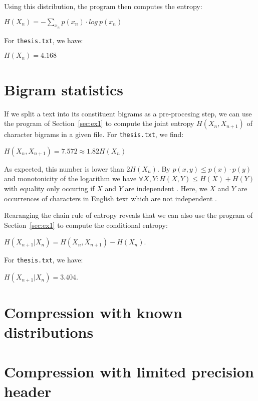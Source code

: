 \documentclass[10pt,a4paper,twoside,onecolumn]{article}
\newcommand*{\thesisTXT}{{\tt thesis.txt}\xspace}
\begin{document}
Using this distribution, the program then computes the entropy:

\begin{center}
    $H(X_n) = -\sum\limits_{x_n} p(x_n) \cdot log~p(x_n)$
\end{center}

For \thesisTXT, we have:

\begin{center}
    $H(X_n) = 4.168$
\end{center}

\section{Bigram statistics}\label{sec:ex2}

If we split a text into its constituent bigrams as a pre-procesing step, we can
use the program of Section~\ref{sec:ex1} to compute the joint entropy $H(X_n,
X_{n+1})$ of character bigrams in a given file. For \thesisTXT, we find:

\begin{center}
    $H(X_n, X_{n+1}) = 7.572 \approx 1.82H(X_n)$
\end{center}

As expected, this number is lower than $2H(X_n)$. By $p(x,y) \le p(x) \cdot
p(y)$ and monotonicity of the logarithm we have $\forall X,Y: H(X, Y) \le H(X) +
H(Y)$ with equality only occuring if $X$ and $Y$ are independent
\cite[p.~138]{mackay}. Here, we $X$ and $Y$ are occurrences of characters in
English text which are not independent \cite[p.~22-24]{mackay}.

Rearanging the chain rule of entropy \cite[p.~139]{mackay} reveals that we can
also use the program of Section~\ref{sec:ex1} to compute the conditional
entropy:

\begin{center}
    $H(X_{n+1} | X_n) = H(X_n, X_{n+1}) - H(X_n)$.
\end{center}

For \thesisTXT, we have:

\begin{center}
    $H(X_{n+1} | X_n) = 3.404$.
\end{center}


\section{Compression with known distributions}\label{sec:ex3}
\section{Compression with limited precision header}\label{sec:ex4}
\end{document}

